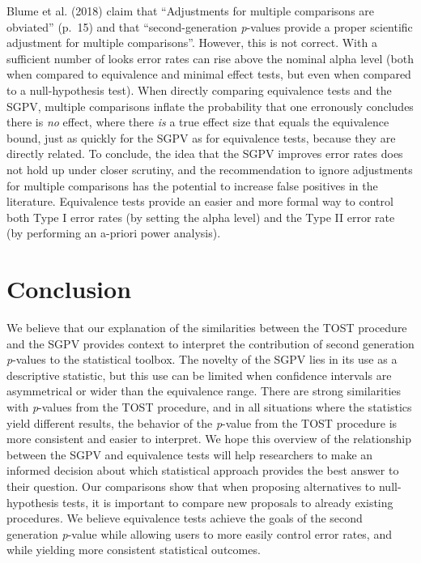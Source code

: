 \documentclass[floatsintext,man]{apa6}
\theoremstyle{definition}
\theoremstyle{definition}
\theoremstyle{definition}
\theoremstyle{remark}
\begin{document}
Blume et al. (2018) claim that \enquote{Adjustments for multiple
comparisons are obviated} (p.~15) and that \enquote{second-generation
\emph{p}-values provide a proper scientific adjustment for multiple
comparisons}. However, this is not correct. With a sufficient number of
looks error rates can rise above the nominal alpha level (both when
compared to equivalence and minimal effect tests, but even when compared
to a null-hypothesis test). When directly comparing equivalence tests
and the SGPV, multiple comparisons inflate the probability that one
erronously concludes there is \emph{no} effect, where there \emph{is} a
true effect size that equals the equivalence bound, just as quickly for
the SGPV as for equivalence tests, because they are directly related. To
conclude, the idea that the SGPV improves error rates does not hold up
under closer scrutiny, and the recommendation to ignore adjustments for
multiple comparisons has the potential to increase false positives in
the literature. Equivalence tests provide an easier and more formal way
to control both Type I error rates (by setting the alpha level) and the
Type II error rate (by performing an a-priori power analysis).

\section{Conclusion}\label{conclusion}

We believe that our explanation of the similarities between the TOST
procedure and the SGPV provides context to interpret the contribution of
second generation \emph{p}-values to the statistical toolbox. The
novelty of the SGPV lies in its use as a descriptive statistic, but this
use can be limited when confidence intervals are asymmetrical or wider
than the equivalence range. There are strong similarities with
\emph{p}-values from the TOST procedure, and in all situations where the
statistics yield different results, the behavior of the \emph{p}-value
from the TOST procedure is more consistent and easier to interpret. We
hope this overview of the relationship between the SGPV and equivalence
tests will help researchers to make an informed decision about which
statistical approach provides the best answer to their question. Our
comparisons show that when proposing alternatives to null-hypothesis
tests, it is important to compare new proposals to already existing
procedures. We believe equivalence tests achieve the goals of the second
generation \emph{p}-value while allowing users to more easily control
error rates, and while yielding more consistent statistical outcomes.
\end{document}
